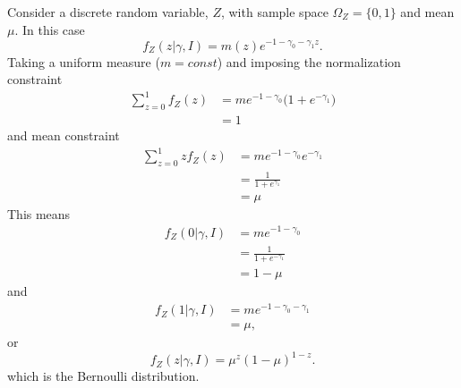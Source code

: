 \begin{example}
	Consider a discrete random variable, $Z$, with sample space $\Omega_Z= \{0,1\}$ and mean $\mu$. In this case
	\begin{equation}
		f_Z(z|\gamma,I) = m(z) e^{-1-\gamma_0 - \gamma_1 z}.
	\end{equation}
	Taking a uniform measure ($m= const$) and imposing the normalization constraint
	\begin{equation}
		\begin{split}
			\sum_{z=0}^1 f_Z(z) &=m e^{-1-\gamma_0}\bigg(1+ e^{- \gamma_1}\bigg)\\
			&=1
		\end{split}
	\end{equation}
	and mean constraint
	\begin{equation}
		\begin{split}
			\sum_{z=0}^1 zf_Z(z) &=m e^{-1-\gamma_0}e^{- \gamma_1}\\
			& = \frac{1}{1+ e^{\gamma_1}}\\
			&=\mu
		\end{split}
	\end{equation}
	This means
	\begin{equation}
		\begin{split}
			f_Z(0|\gamma,I) &= m e^{-1-\gamma_0}\\
			&= \frac{1}{1+ e^{- \gamma_1}}\\
			& = 1-\mu
		\end{split}
	\end{equation}	
	and
	\begin{equation}
		\begin{split}
			f_Z(1|\gamma,I) &= m e^{-1-\gamma_0-\gamma_1}\\
			&=\mu,
		\end{split}
	\end{equation}
	or 
	\begin{equation}
		f_Z(z|\gamma,I) = \mu^z (1-\mu)^{1-z}.
	\end{equation}
	which is the Bernoulli distribution.
\end{example}

